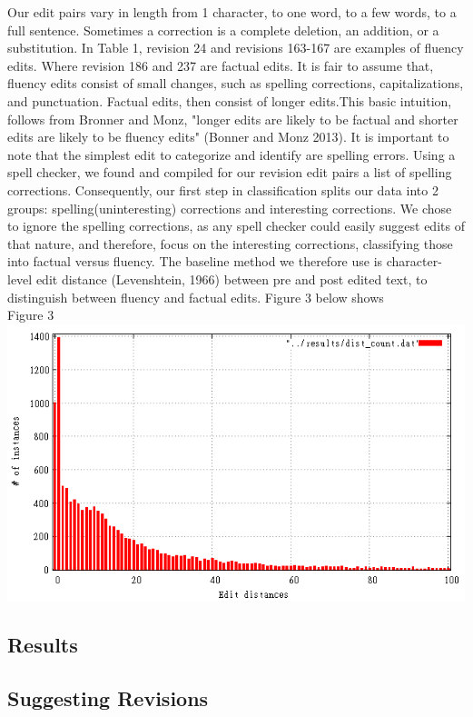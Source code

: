 \documentclass[11pt, oneside]{article}   	%
\begin{document}
Our edit pairs vary in length from 1 character, to one word, to a few words, to a full sentence. Sometimes a correction is a complete deletion, an addition, or a substitution. In Table 1, revision 24 and revisions 163-167 are examples of fluency edits. Where revision 186 and 237 are factual edits. It is fair to assume that, fluency edits consist of small changes, such as spelling corrections, capitalizations, and punctuation. Factual edits, then consist of longer edits.This basic intuition, follows from Bronner and Monz, "longer edits are likely to be factual and shorter edits are likely to be fluency edits" (Bonner and Monz 2013). It is important to note that the simplest edit to categorize and identify are spelling errors. Using a spell checker, we found and compiled for our revision edit pairs a list of spelling corrections. Consequently, our first step in classification splits our data into 2 groups: spelling(uninteresting) corrections and interesting corrections. We chose to ignore the spelling corrections, as any spell checker could easily suggest edits of that nature, and therefore, focus on the interesting corrections, classifying those into factual versus fluency. The baseline method we therefore use is character-level edit distance (Levenshtein, 1966) between pre and post edited text, to distinguish between fluency and factual edits. Figure 3 below shows  
\\[.5cm]

\centering
Figure 3
\includegraphics[width=\textwidth]{edit-dist-instances}



\raggedright
\subsection{Results}
\subsection{Suggesting Revisions}
\end{document}
